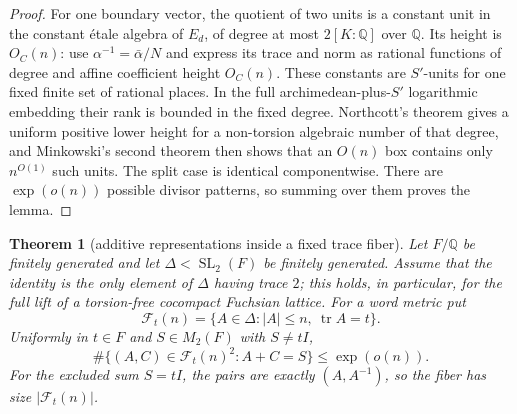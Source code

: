 \documentclass[11pt,reqno]{amsart}
\newtheorem{theorem}{Theorem}[section]
\theoremstyle{definition}
\theoremstyle{remark}
\newcommand{\Q}{\mathbb Q}
\newcommand{\Tr}{\operatorname{tr}}
\newcommand{\SL}{\operatorname{SL}}
\begin{document}
\begin{proof}
For one boundary vector, the quotient of two units is a constant unit in
the constant \'etale algebra of \(E_d\), of degree at most
\(2[K:\Q]\) over \(\Q\).  Its height is \(O_C(n)\): use
\(\alpha^{-1}=\bar\alpha/N\) and express its trace and norm as rational
functions of degree and affine coefficient height \(O_C(n)\).  These
constants are \(S'\)-units for one fixed finite set of rational places.  In
the full archimedean-plus-\(S'\) logarithmic embedding their rank is bounded
in the fixed degree.  Northcott's theorem
\cite[Theorem~1.6.8]{BombieriGubler} gives a uniform positive lower
height for a non-torsion algebraic number of that degree, and Minkowski's
second theorem then shows that an \(O(n)\) box contains only \(n^{O(1)}\)
such units.  The split case is identical componentwise.  There are
\(\exp(o(n))\) possible divisor patterns, so summing over them proves the
lemma.
\end{proof}

\begin{theorem}[additive representations inside a fixed trace fiber]
\label{thm:same-trace-sum-fiber}
Let \(F/\Q\) be finitely generated and let
\(\Delta<\SL_2(F)\) be finitely generated.  Assume that the identity is the
only element of \(\Delta\) having trace \(2\); this holds, in particular,
for the full lift of a torsion-free cocompact Fuchsian lattice.  For a word
metric put
\[
 \mathcal F_t(n)=\{A\in\Delta:|A|\le n,\ \Tr A=t\}.
\]
Uniformly in \(t\in F\) and \(S\in M_2(F)\) with \(S\ne tI\),
\[
 \#\{(A,C)\in\mathcal F_t(n)^2:A+C=S\}\le\exp(o(n)).
\]
For the excluded sum \(S=tI\), the pairs are exactly
\((A,A^{-1})\), so the fiber has size \(|\mathcal F_t(n)|\).
\end{theorem}
\end{document}
